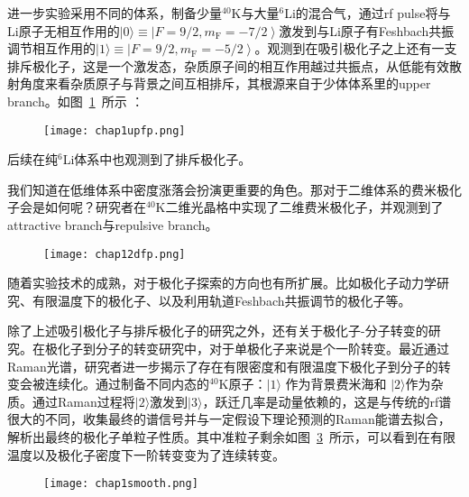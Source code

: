 进一步实验\cite{kohstall2012metastability}采用不同的体系，制备少量${}^{40}$K与大量${}^{6}$Li的混合气，通过rf pulse将与Li原子无相互作用的$|0\rangle\equiv\left|F=9 / 2, m_{\mathrm{F}}=-7 / 2\right\rangle$激发到与Li原子有Feshbach共振调节相互作用的$|1\rangle \equiv\left|F=9 / 2, m_{\mathrm{F}}=-5 / 2\right\rangle$。观测到在吸引极化子之上还有一支排斥极化子，这是一个激发态，杂质原子间的相互作用越过共振点，从低能有效散射角度来看杂质原子与背景之间互相排斥，其根源来自于少体体系里的upper branch。如图~\ref{upfp}~所示 ：
\begin{figure}[!htbp]
    \centering
    \texttt{[image: chap1upfp.png]}
    \label{upfp}
\end{figure}
后续在纯${}^{6}$Li体系中也观测到了排斥极化子\cite{Scazzarepulsive}。

我们知道在低维体系中密度涨落会扮演更重要的角色。那对于二维体系的费米极化子会是如何呢？研究者在${}^{40}$K二维光晶格中实现了二维费米极化子，并观测到了attractive branch与repulsive branch\cite{koschorreck2012attractive}。
\begin{figure}[!htbp]
    \centering
    \texttt{[image: chap12dfp.png]}
    \label{2dfp}
\end{figure}

随着实验技术的成熟，对于极化子探索的方向也有所扩展。比如极化子动力学研究\cite{cetina2016ultrafast}、有限温度下的极化子\cite{YanBoiling}、以及利用轨道Feshbach共振调节的极化子等\cite{Darkwah2019}。

除了上述吸引极化子与排斥极化子的研究之外，还有关于极化子-分子转变的研究。在极化子到分子的转变研究中，对于单极化子来说是个一阶转变。最近通过Raman光谱，研究者进一步揭示了存在有限密度和有限温度下极化子到分子的转变会被连续化。通过制备不同内态的${}^{40}$K原子：$|1\rangle$ 作为背景费米海和 $|2\rangle$作为杂质。通过Raman过程将$|2\rangle$激发到$|3\rangle$，跃迁几率是动量依赖的，这是与传统的rf谱很大的不同，收集最终的谱信号并与一定假设下理论预测的Raman能谱去拟合，解析出最终的极化子单粒子性质。其中准粒子剩余如图~\ref{fpsmooth}~所示，可以看到在有限温度以及极化子密度下一阶转变变为了连续转变。
\begin{figure}[!htbp]
    \centering
    \texttt{[image: chap1smooth.png]}
    \label{fpsmooth}
\end{figure}



